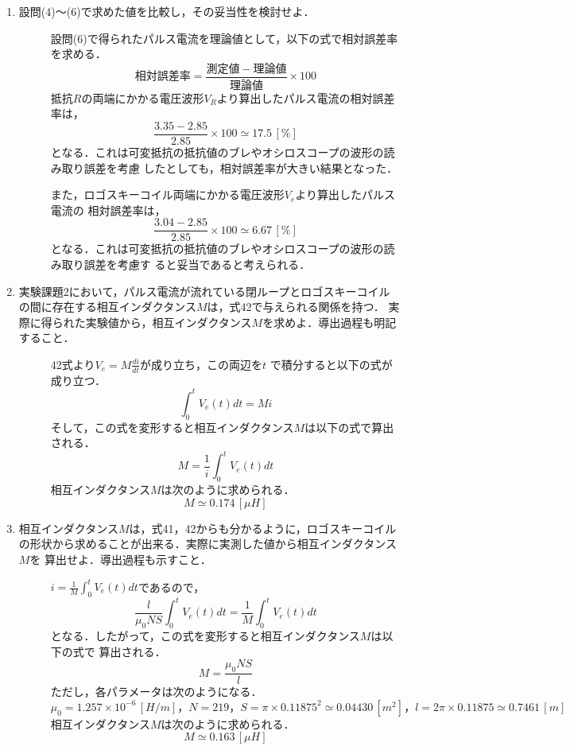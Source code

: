\begin{enumerate}
    \item 設問(4)～(6)で求めた値を比較し，その妥当性を検討せよ．
    \begin{description}
        \item[] 設問(6)で得られたパルス電流を理論値として，以下の式で相対誤差率を求める．
        $$
        相対誤差率=\frac{測定値-理論値}{理論値}\times 100
        $$
        抵抗$R$の両端にかかる電圧波形$V_R$より算出したパルス電流の相対誤差率は，
        $$
        \frac{3.35-2.85}{2.85}\times 100\simeq 17.5\,[\%]
        $$
        となる．これは可変抵抗の抵抗値のブレやオシロスコープの波形の読み取り誤差を考慮
        したとしても，相対誤差率が大きい結果となった．

        また，ロゴスキーコイル両端にかかる電圧波形$V_e$より算出したパルス電流の
        相対誤差率は，
        $$
        \frac{3.04-2.85}{2.85}\times 100 \simeq 6.67\,[\%]
        $$
        となる．これは可変抵抗の抵抗値のブレやオシロスコープの波形の読み取り誤差を考慮す
        ると妥当であると考えられる．
    \end{description}

    \newpage

    \item 実験課題2において，パルス電流が流れている閉ループとロゴスキーコイル
    の間に存在する相互インダクタンス$M$は，式42で与えられる関係を持つ．
    実際に得られた実験値から，相互インダクタンス$M$を求めよ．導出過程も明記すること．
    \begin{description}
        \item[] 42式より$V_e=M\frac{di}{dt}$が成り立ち，この両辺を$t$
        で積分すると以下の式が成り立つ．
        $$
        \int_{0}^{t}V_e(t)dt=Mi
        $$
        そして，この式を変形すると相互インダクタンス$M$は以下の式で算出される．
        $$
        M=\frac{1}{i}\int_{0}^{t}V_e(t)dt
        $$
        相互インダクタンス$M$は次のように求められる．
        $$
        M\simeq 0.174\,[\si{\mu H}]
        $$
    \end{description}

    \item 相互インダクタンス$M$は，式41，42からも分かるように，ロゴスキーコイル
    の形状から求めることが出来る．実際に実測した値から相互インダクタンス$M$を
    算出せよ．導出過程も示すこと．
    \begin{description}
        \item[] $i=\frac{1}{M}\int_{0}^{t}V_e(t)dt$であるので，
        $$
        \frac{l}{\mu_0 NS}\int_{0}^{t}V_e(t)dt=\frac{1}{M}\int_{0}^{t}V_e(t)dt
        $$
        となる．したがって，この式を変形すると相互インダクタンス$M$は以下の式で
        算出される．
        $$
        M=\frac{\mu_0 NS}{l}
        $$
        ただし，各パラメータは次のようになる．
        $$
        \mu_0=1.257\times 10^{-6}\,[\si{H/m}]，N=219，S=\pi\times 0.11875^2\simeq 0.04430\,[\si{m^2}]，l=2\pi\times 0.11875\simeq 0.7461\,[\si{m}]
        $$
        相互インダクタンス$M$は次のように求められる．
        $$
        M\simeq 0.163\,[\si{\mu H}]
        $$
    \end{description}


\end{enumerate}
